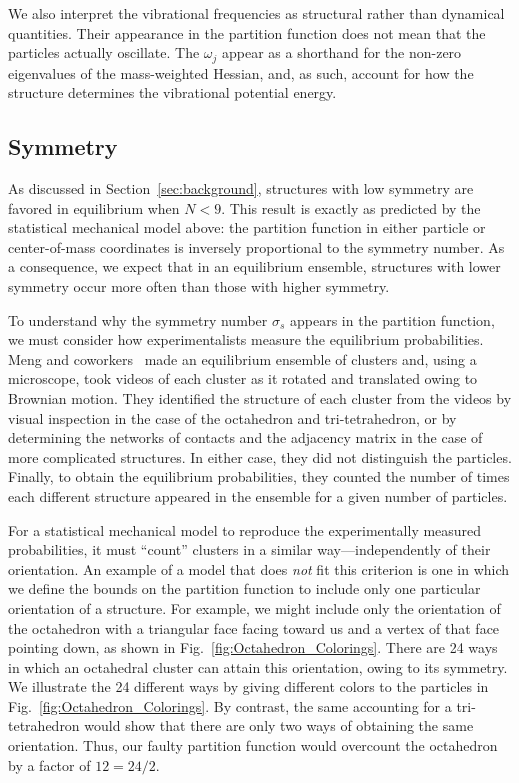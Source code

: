 \documentclass[pre, aps, twocolumn, reprint, amsmath,amssymb, showpacs,
superscriptaddress] {revtex4-1}
\begin{document}
We also interpret the vibrational frequencies as structural rather than
dynamical quantities. Their appearance in the partition function does
not mean that the particles actually oscillate. The $\omega_j$ appear as
a shorthand for the non-zero eigenvalues of the mass-weighted Hessian,
and, as such, account for how the structure determines the vibrational
potential energy.

\subsection{Symmetry}\label{sec:SymmetryNumber}

As discussed in Section~\ref{sec:background}, structures with low
symmetry are favored in equilibrium when $N<9$. This result is exactly
as predicted by the statistical mechanical model above: the partition
function in either particle or center-of-mass coordinates is inversely
proportional to the symmetry number. As a consequence, we expect that in
an equilibrium ensemble, structures with lower symmetry occur more often
than those with higher symmetry.

To understand why the symmetry number $\sigma_s$ appears in the
partition function, we must consider how experimentalists measure the
equilibrium probabilities. Meng and coworkers~\cite{meng10} made an
equilibrium ensemble of clusters and, using a microscope, took videos of
each cluster as it rotated and translated owing to Brownian motion. They
identified the structure of each cluster from the videos by visual
inspection in the case of the octahedron and tri-tetrahedron, or by
determining the networks of contacts and the adjacency matrix in the
case of more complicated structures. In either case, they did not
distinguish the particles. Finally, to obtain the equilibrium
probabilities, they counted the number of times each different structure
appeared in the ensemble for a given number of particles.

For a statistical mechanical model to reproduce the experimentally
measured probabilities, it must ``count'' clusters in a similar
way---independently of their orientation. An example of a model that
does \emph{not} fit this criterion is one in which we define the bounds
on the partition function to include only one particular orientation of
a structure. For example, we might include only the orientation of the
octahedron with a triangular face facing toward us and a vertex of that
face pointing down, as shown in Fig.~\ref{fig:Octahedron_Colorings}.
There are 24 ways in which an octahedral cluster can attain this
orientation, owing to its symmetry. We illustrate the 24 different ways
by giving different colors to the particles in
Fig.~\ref{fig:Octahedron_Colorings}. By contrast, the same accounting
for a tri-tetrahedron would show that there are only two ways of
obtaining the same orientation. Thus, our faulty partition function
would overcount the octahedron by a factor of $12=24/2$.
\end{document}
